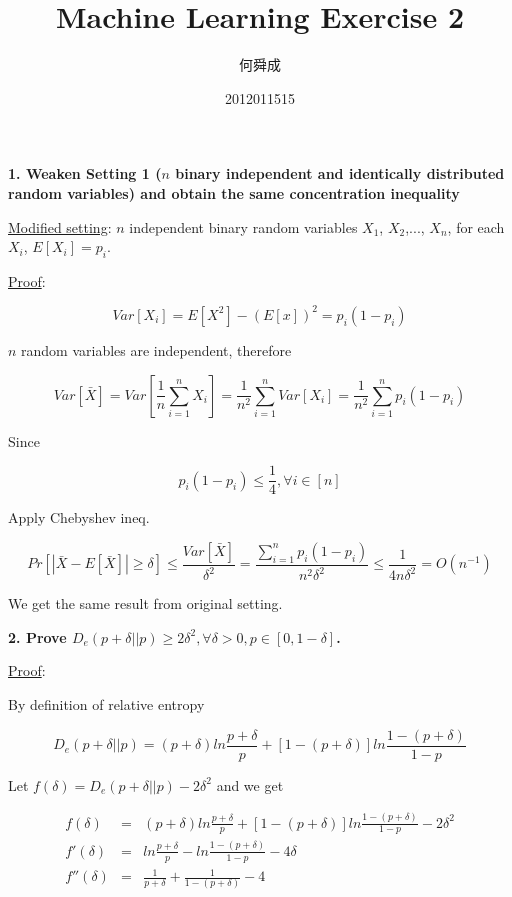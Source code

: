 \documentclass[UTF8]{ctexart}
\author{何舜成}
\date{2012011515}
\title{Machine Learning Exercise 2}
\begin{document}
\maketitle
\textbf{1. Weaken Setting 1 ($n$ binary independent and identically distributed random variables) and obtain the same concentration inequality}\par
\uline{Modified setting}: $n$ independent binary random variables $X_{1}$, $X_{2}$,..., $X_{n}$, for each $X_{i}$, $E[X_{i}]=p_{i}$.\par
\uline{Proof}:\par
\begin{equation*}
Var[X_{i}]=E[X^{2}]-(E[x])^{2}=p_{i}(1-p_{i})
\end{equation*}\par
$n$ random variables are independent, therefore\par
\begin{equation*}
Var[\bar{X}]=Var[\frac{1}{n}\sum_{i=1}^{n}X_{i}]=\frac{1}{n^{2}}\sum_{i=1}^{n}Var[X_{i}]=\frac{1}{n^{2}}\sum_{i=1}^{n}p_{i}(1-p_{i})
\end{equation*}\par
Since\par
\begin{equation*}
p_{i}(1-p_{i})\leq\frac{1}{4}, \forall i\in[n]
\end{equation*}\par
Apply Chebyshev ineq.\par
\begin{equation*}
Pr[|\bar{X}-E[\bar{X}]|\geq\delta]\leq\frac{Var[\bar{X}]}{\delta^{2}}=\frac{\sum_{i=1}^{n}p_{i}(1-p_{i})}{n^{2}\delta^{2}}\leq\frac{1}{4n\delta^{2}}=O(n^{-1})
\end{equation*}\par
We get the same result from original setting.\par
\textbf{2. Prove $D_{e}(p+\delta||p)\geq2\delta^{2}, \forall\delta>0, p\in[0,1-\delta]$.}\par
\uline{Proof}:\par
By definition of relative entropy\par
\begin{equation*}
D_{e}(p+\delta||p)=(p+\delta)ln\frac{p+\delta}{p}+[1-(p+\delta)]ln\frac{1-(p+\delta)}{1-p}
\end{equation*}\par
Let $f(\delta)=D_{e}(p+\delta||p)-2\delta^{2}$ and we get\par
\begin{eqnarray*}
f(\delta)&=&(p+\delta)ln\frac{p+\delta}{p}+[1-(p+\delta)]ln\frac{1-(p+\delta)}{1-p}-2\delta^{2}\\
f'(\delta)&=&ln\frac{p+\delta}{p}-ln\frac{1-(p+\delta)}{1-p}-4\delta\\
f''(\delta)&=&\frac{1}{p+\delta}+\frac{1}{1-(p+\delta)}-4\\
\end{eqnarray*}\par
\end{document}
